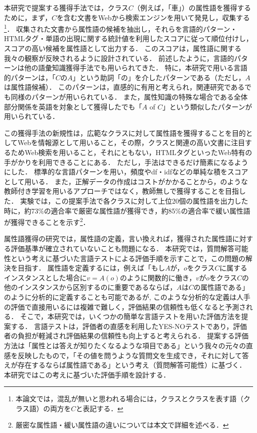 本研究で提案する獲得手法では，クラス$C$（例えば，「車」）の属性語を獲得するために，まず，$C$を含む文書をWebから検索エンジンを用いて発見し，収集する\footnote{本論文では，混乱が無いと思われる場合には，クラスとクラスを表す語（クラス語）の両方を$C$と表記する．}．
収集された文書から属性語の候補を抽出し，それらを言語的パターン・HTMLタグ・単語の出現に関する統計値を利用したスコアに従って順位付けし，スコアの高い候補を属性語として出力する．
このスコアは，属性語に関する我々の観察が反映されるように設計されている．
前述したように，言語的パターンは他の語彙知識獲得手法でも用いられてきた\cite{Fleischman_2003,almuhareb-poesio:2004:EMNLP,Hearst_1992,Barland_ACL1999,takahashi_2004}．
特に，本研究で用いる言語的パターンは，「$C$の$A$」という助詞「の」を介したパターンである（ただし，$A$は属性語候補）． 
このパターンは，直感的に有用と考えられ，関連研究である\cite{takahashi_2004}でも同様のパターンが用いられている．
また，属性知識の特殊な場合である全体部分関係を英語を対象として獲得した\cite{Barland_ACL1999}でも「$A$ of $C$」という類似したパターンが用いられている．

この獲得手法の新規性は，広範なクラスに対して属性語を獲得することを目的としてWebを情報源として用いること，その際，クラスと関連の高い文書に注目するためWeb検索を用いること，それにともない，HTMLタグといったWeb特有の手がかりを利用できることにある．
ただし，手法はできるだけ簡素になるようにした．
標準的な言語パターンを用い，頻度やdf・idfなどの単純な積をスコアとして用いる．
また，正解データの作成はコストがかかることから，\cite{Fleischman_2003}のような教師付き学習を用いるアプローチではなく，教師無しで獲得することを目指した．
実験では，この提案手法で各クラスに対して上位20個の属性語を出力した時に，約73\%の適合率で厳密な属性語が獲得でき，約85\%の適合率で緩い属性語が獲得できることを示す\footnote{厳密な属性語・緩い属性語の違いについては本文で詳細を述べる．}．


属性語獲得の研究では，属性語の定義，言い換えれば，獲得された属性語に対する評価基準が確立されていないことも問題になる．
本研究では，質問解答可能性という考えに基づいた言語テストによる評価手順を示すことで，この問題の解決を目指す．
属性語を定義するには，例えば「もし$A$が，$o$をクラス$C$に属するインスタンスとした場合に$v=A(o)$のように関数的に働き，$v$が$o$をクラス$C$の他のインスタンスから区別するのに重要であるならば，$A$は$C$の属性語である」のように分析的に定義することも可能であるが,
このような分析的な定義は人手の評価で直接用いるには複雑で難しく，評価結果の信頼性も低くなると予測される．
そこで，本研究では，いくつかの簡単な言語テストを用いた評価方法を提案する．
言語テストは，評価者の直感を利用したYES-NOテストであり，評価者の負担が軽減され評価結果の信頼性も向上すると考えられる．
提案する評価方法は「属性とは答えが知りたくなるような項目である」という我々の元々の直感を反映したもので，「その値を問うような質問文を生成でき，それに対して答えが存在するならば属性語である」という考え（質問解答可能性）に基づく．
本研究ではこの考えに基づいた評価手順を設計する．

